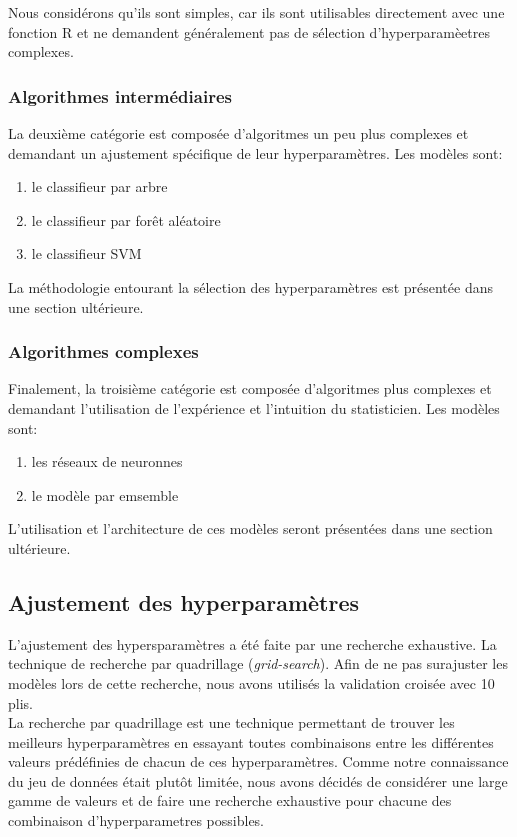 Nous considérons qu'ils sont simples, car ils sont utilisables directement avec une fonction R et ne demandent généralement pas de sélection d'hyperparamèetres complexes.

\subsubsection{Algorithmes intermédiaires}
La deuxième catégorie est composée d'algoritmes un peu plus complexes et demandant un ajustement spécifique de leur hyperparamètres. Les modèles sont:

\begin{enumerate}
  \item le classifieur par arbre
  \item le classifieur par forêt aléatoire
  \item le classifieur SVM 
\end{enumerate}

La méthodologie entourant la sélection des hyperparamètres est présentée dans une section ultérieure.

\subsubsection{Algorithmes complexes}
Finalement, la troisième catégorie est composée d'algoritmes plus complexes et demandant l'utilisation de l'expérience et l'intuition du statisticien. Les modèles sont:

\begin{enumerate}
  \item les réseaux de neuronnes
  \item le modèle par emsemble
\end{enumerate}

L'utilisation et l'architecture de ces modèles seront présentées dans une section ultérieure.

\subsection{Ajustement des hyperparamètres}
L'ajustement des hypersparamètres a été faite par une recherche exhaustive. La technique de recherche par quadrillage (\textit{grid-search}). Afin de ne pas surajuster les modèles lors de cette recherche, nous avons utilisés la validation croisée avec 10 plis.\\
La recherche par quadrillage est une technique permettant de trouver les meilleurs hyperparamètres en essayant toutes combinaisons entre les différentes valeurs prédéfinies de chacun de ces hyperparamètres. Comme notre connaissance du jeu de données était plutôt limitée, nous avons décidés de considérer une large gamme de valeurs et de faire une recherche exhaustive pour chacune des combinaison d'hyperparametres possibles.

